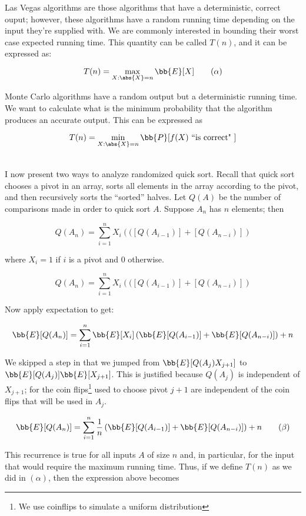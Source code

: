 \documentclass[../main.tex]{subfiles}
\begin{document}
\begin{outline}
    \1 Las Vegas algorithms are those algorithms that have a deterministic, correct ouput; however, these algorithms have a random running time depending on the input they're supplied with.
    \2 We are commonly interested in bounding their worst case expected running time. This quantity can be called $T(n)$, and it can be expressed as: 

    \[
        T(n) = \max_{X: \abs{X} = n} \bb{E}[X] \tag{$\alpha$}
    \]

    \1 Monte Carlo algorithms have a random output but a deterministic running time. We want to calculate what is the minimum probability that the algorithm produces an accurate output.
    \2 This can be expressed as 

    \[
        T(n) = \min_{X : \abs{X} = n } \bb{P}[f(X) \text{ ``is correct" }]
    \]
\end{outline}

\breathe \\
I now present two ways to analyze randomized quick sort. Recall that quick sort chooses a pivot in an array, sorts all elements in the array according to the pivot, and then recursively sorts the
``sorted'' halves. Let $Q(A)$ be the number of comparisons made
in order to quick sort $A$. Suppose $A_n$ has $n$ elements; then

\[
    Q(A_n) = \sum_{i=1}^{n} X_{i}\left( ( [Q(A_{i-1})] + [Q(A_{n-i})] \right)
\]

where $X_{i} = 1$ if $i$ is a pivot and $0$ otherwise.

\[
    Q(A_n) = \sum_{i=1}^{n} X_{i}\left( ( [Q(A_{i-1})] + [Q(A_{n-i})] \right)
\]

Now apply expectation to get:

\[
    \bb{E}[Q(A_n)] = \sum_{i=1}^{n}\bb{E}[X_{i}]\left( \bb{E}[Q(A_{i-1})] + \bb{E}[Q(A_{n-i})] \right) + n
\]

We skipped a step in that we jumped from $\bb{E}[Q(A_{j})X_{j+1}]$ to $\bb{E}[Q(A_{j})] \bb{E}[X_{j+1}]$. This is justified because $Q(A_{j})$ is independent of $X_{j+1}$; for the coin flips\footnote{We use coinflips to simulate a uniform distribution} used to choose pivot $j+1$ are independent of the coin flips that will be used in $A_{j}$.

\[
    \bb{E}[Q(A_n)] = \sum_{i=1}^{n}\frac{1}{n}\left( \bb{E}[Q(A_{i-1})] + \bb{E}[Q(A_{n-i})] \right) + n \tag{$\beta$}
\]


This recurrence is true for all inputs $A$ of size $n$ and, in particular, for the input that would require the maximum running time. Thus, if we define $T(n)$ as we did in $(\alpha)$, then the expression above becomes
\end{document}

